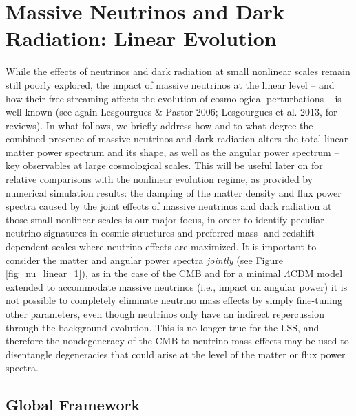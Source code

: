 \documentclass{emulateapj}
\begin{document}

\section{Massive Neutrinos and Dark Radiation: Linear Evolution} \label{section_linear}


While the effects of neutrinos and dark radiation at small nonlinear scales remain still poorly explored, 
the impact of massive neutrinos at the linear level -- and how their
free streaming   affects the evolution of cosmological
perturbations  --  is well known (see again Lesgourgues \& Pastor 2006; Lesgourgues et al. 2013, for reviews).
In what follows, 
we briefly address how and to what degree the combined presence of massive neutrinos and dark radiation alters the total linear matter power spectrum and its
shape, as well as the angular power spectrum -- key observables at 
large cosmological scales. 
This will be useful later on for relative comparisons 
with the nonlinear evolution regime, as provided by numerical simulation results: 
the damping of the matter density and flux power spectra caused by the joint effects of massive neutrinos and dark radiation at those small nonlinear scales 
is our major focus, in order to identify peculiar neutrino signatures in cosmic structures and preferred mass- and redshift-dependent 
scales where neutrino effects are maximized. 
It is important to consider the matter and angular power spectra \textit{jointly} (see Figure \ref{fig_nu_linear_1}), as
in the case of the CMB and for a minimal $\Lambda$CDM model extended to accommodate massive neutrinos (i.e., impact on angular power) it is not possible to completely 
eliminate neutrino mass effects by simply fine-tuning other parameters, even though neutrinos only have
  an indirect repercussion through the background evolution. This is no longer true for the LSS, and therefore
the nondegeneracy of the CMB to neutrino mass effects may be used to
disentangle degeneracies that could arise at the level of the matter or flux power spectra. 


\subsection{Global Framework}
\end{document}
